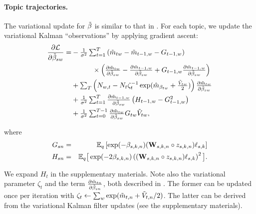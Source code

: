 \paragraph{Topic trajectories.}
The variational update for $\tilde{\beta}$ is similar to that in
\cite{blei:2006}. For each topic, we update the variational Kalman   %
``observations'' by applying gradient ascent:
\begin{align*}
\frac{\partial \mathcal{L}}{\partial \tilde{\beta}_{sw}} =
   & - \textstyle \frac{1}{\sigma^2} \sum_{t=1}^T
     \left( \tilde{m}_{tw} - \tilde{m}_{t-1,w} - G_{t-1,w} \right) \\
   & \hspace{30pt} \textstyle \times \left( \frac{\partial \tilde{m}_{tw}}{\partial \tilde{\beta}_{sw}}
     - \frac{\partial \tilde{m}_{t-1,w}}{\partial \tilde{\beta}_{sw}}
     + G_{t-1,w} \frac{\partial \tilde{m}_{t-1,w}}{\partial \tilde{\beta}_{sw}} \right) \\
   & + \textstyle \sum_T \left(
       N_{w,t} - N_{t} \zeta_t^{-1}
       \exp( \hat{m}_{\beta_{tw}} + \frac{\tilde{V}_{tw}}{2} ) \right)
       \frac{\partial \tilde{m}_{tw}}{\partial \tilde{\beta}_{sw}} \\
   & + \textstyle \frac{1}{\sigma^2} \sum_{t=1}^T
         \frac{\partial \tilde{m}_{t-1,w}}{\partial \tilde{\beta}_{sw}}
         \left( H_{t-1,w} - G_{t-1,w}^2 \right) \\
   & + \textstyle \frac{1}{\sigma^2} \sum_{t=0}^{T-1}
         \frac{\partial \tilde{m}_{tw}}{\partial \tilde{\beta}_{sw}}
         G_{tw} \tilde{V}_{tw}, \\
\end{align*}

\vspace{-29pt}
where
\begin{eqnarray*}
\textstyle G_{sn} &=& \mathbb{E}_q\left[\exp(-\beta_{s,k,n} ) ( \textbf{W}_{s,k,n} \circ
  z_{s,k,n} ) \ell_{s,k}\right] \\
\textstyle H_{sn} &=& \mathbb{E}_q \big[ \exp(-2 \beta_{s,k,n}) \left( (\textbf{W}_{s,k,n} \circ z_{s,k,n} ) \ell_{s,k} \right)^2 \big]. \\
\end{eqnarray*}

\vspace{-14pt}
We expand $H_t$ in the supplementary materials. Note also the
variational parameter $\zeta_t$ and the term
$\frac{\partial \tilde{m}_{tn}}{\partial \tilde{\beta}_{sn}}$, both described in \cite{blei:2006}. The  %
former can be updated once per iteration with $\zeta_t \gets \sum_w
\exp(\tilde{m}_{t,n} + \tilde{V}_{t,n}/2)$. The latter can be derived from the
variational Kalman filter updates (see the supplementary materials).

